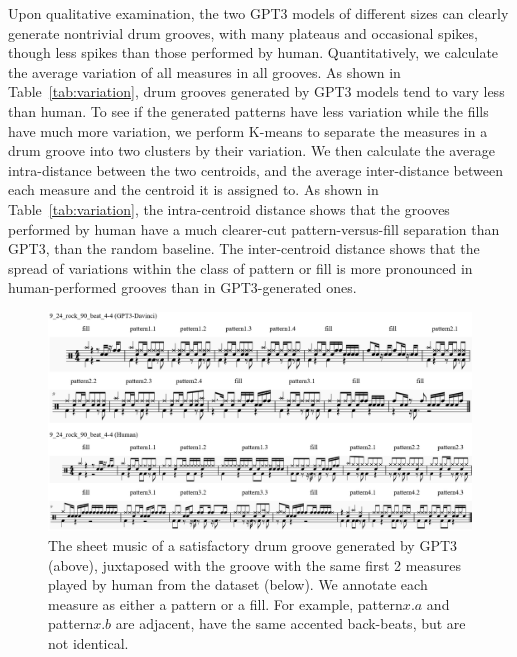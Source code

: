 \documentclass[letterpaper]{article} %
\begin{document}
Upon qualitative examination, the two GPT3 models of different sizes can clearly generate nontrivial drum grooves, with many plateaus and occasional spikes, though less spikes than those performed by human. Quantitatively, we calculate the average variation of all measures in all grooves. As shown in Table~\ref{tab:variation}, drum grooves generated by GPT3 models tend to vary less than human. To see if the generated patterns have less variation while the fills have much more variation, we perform K-means to separate the measures in a drum groove into two clusters by their variation. We then calculate the average intra-distance between the two centroids, and the average inter-distance between each measure and the centroid it is assigned to. As shown in Table~\ref{tab:variation}, the intra-centroid distance shows that the grooves performed by human have a much clearer-cut pattern-versus-fill separation than GPT3, than the random baseline. The inter-centroid distance shows that the spread of variations within the class of pattern or fill is more pronounced in human-performed grooves than in GPT3-generated ones.

\begin{figure}
\centering
\includegraphics[scale=0.63]{images/good_example.png}
\caption{The sheet music of a satisfactory drum groove generated by GPT3 (above), juxtaposed with the groove with the same first 2 measures played by human from the dataset (below). We annotate each measure as either a pattern or a fill. For example, pattern$x$.$a$ and pattern$x$.$b$ are adjacent, have the same accented back-beats, but are not identical.}
\label{fig:good_example}
\end{figure}
\end{document}
